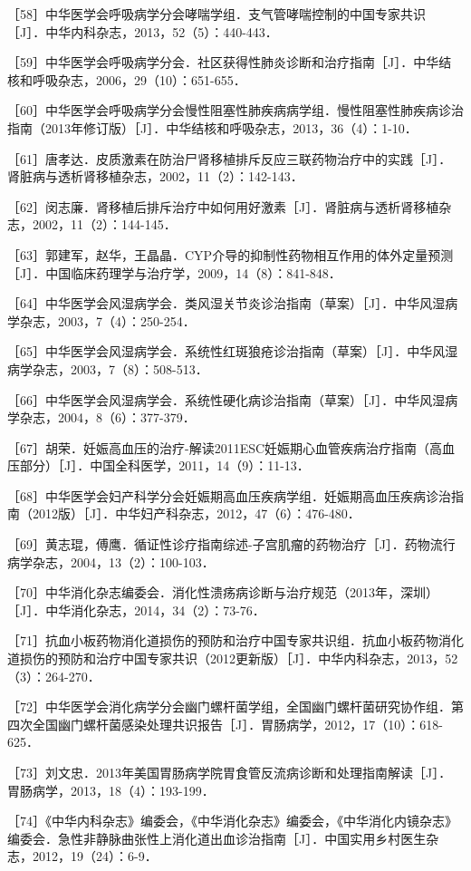 ［58］中华医学会呼吸病学分会哮喘学组．支气管哮喘控制的中国专家共识［J］．中华内科杂志，2013，52（5）：440-443．

［59］中华医学会呼吸病学分会．社区获得性肺炎诊断和治疗指南［J］．中华结核和呼吸杂志，2006，29（10）：651-655．

［60］中华医学会呼吸病学分会慢性阻塞性肺疾病病学组．慢性阻塞性肺疾病诊治指南（2013年修订版）［J］．中华结核和呼吸杂志，2013，36（4）：1-10．

［61］唐孝达．皮质激素在防治尸肾移植排斥反应三联药物治疗中的实践［J］．肾脏病与透析肾移植杂志，2002，11（2）：142-143．

［62］闵志廉．肾移植后排斥治疗中如何用好激素［J］．肾脏病与透析肾移植杂志，2002，11（2）：144-145．

［63］郭建军，赵华，王晶晶．CYP介导的抑制性药物相互作用的体外定量预测［J］．中国临床药理学与治疗学，2009，14（8）：841-848．

［64］中华医学会风湿病学会．类风湿关节炎诊治指南（草案）［J］．中华风湿病学杂志，2003，7（4）：250-254．

［65］中华医学会风湿病学会．系统性红斑狼疮诊治指南（草案）［J］．中华风湿病学杂志，2003，7（8）：508-513．

［66］中华医学会风湿病学会．系统性硬化病诊治指南（草案）［J］．中华风湿病学杂志，2004，8（6）：377-379．

［67］胡荣．妊娠高血压的治疗-解读2011ESC妊娠期心血管疾病治疗指南（高血压部分）［J］．中国全科医学，2011，14（9）：11-13．

［68］中华医学会妇产科学分会妊娠期高血压疾病学组．妊娠期高血压疾病诊治指南（2012版）［J］．中华妇产科杂志，2012，47（6）：476-480．

［69］黄志琨，傅鹰．循证性诊疗指南综述-子宫肌瘤的药物治疗［J］．药物流行病学杂志，2004，13（2）：100-103．

［70］中华消化杂志编委会．消化性溃疡病诊断与治疗规范（2013年，深圳）［J］．中华消化杂志，2014，34（2）：73-76．

［71］抗血小板药物消化道损伤的预防和治疗中国专家共识组．抗血小板药物消化道损伤的预防和治疗中国专家共识（2012更新版）［J］．中华内科杂志，2013，52（3）：264-270．

［72］中华医学会消化病学分会幽门螺杆菌学组，全国幽门螺杆菌研究协作组．第四次全国幽门螺杆菌感染处理共识报告［J］．胃肠病学，2012，17（10）：618-625．

［73］刘文忠．2013年美国胃肠病学院胃食管反流病诊断和处理指南解读［J］．胃肠病学，2013，18（4）：193-199．

［74］《中华内科杂志》编委会，《中华消化杂志》编委会，《中华消化内镜杂志》编委会．急性非静脉曲张性上消化道出血诊治指南［J］．中国实用乡村医生杂志，2012，19（24）：6-9．

